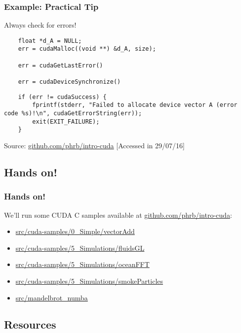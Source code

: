 \documentclass[10pt, compress]{beamer}
\begin{document}
\begin{frame}[fragile]
    \frametitle{Example: Practical Tip}
    \alert{Always} check for errors!

    \begin{lstlisting}
    float *d_A = NULL;
    err = cudaMalloc((void **) &d_A, size);

    err = cudaGetLastError()

    err = cudaDeviceSynchronize()
    \end{lstlisting}

    \begin{lstlisting}
    if (err != cudaSuccess) {
        fprintf(stderr, "Failed to allocate device vector A (error code %s)!\n", cudaGetErrorString(err));
        exit(EXIT_FAILURE);
    }
    \end{lstlisting}

    \begin{center}
        \tiny{Source: \url{github.com/phrb/intro-cuda} [Accessed in 29/07/16]}
    \end{center}
\end{frame}

\subsection{Hands on!}

\begin{frame}
    \frametitle{Hands on!}
    We'll run some CUDA C samples available at
    \url{github.com/phrb/intro-cuda}:
    \begin{itemize}
        \item \url{src/cuda-samples/0_Simple/vectorAdd}

        \item \url{src/cuda-samples/5_Simulations/fluidsGL}
        \item \url{src/cuda-samples/5_Simulations/oceanFFT}
        \item \url{src/cuda-samples/5_Simulations/smokeParticles}

        \item \url{src/mandelbrot_numba}
    \end{itemize}
\end{frame}

\subsection{Resources}
\end{document}
